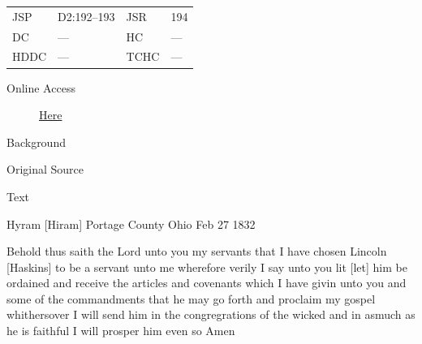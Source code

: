 				\begin{tabular}{p{0.5in}p{1in}p{0.5in}p{1in}}
				JSP	 	& D2:192--193	& JSR 		& 194 \\
				DC	 	& ---	 	& HC 		& --- \\
				HDDC 	& ---		& TCHC 		& --- \\
				\end{tabular}
			
			\begin{description}
				\item[Online Access] \href{https://www.josephsmithpapers.org/paper-summary/revelation-27-february-1832/1}{Here}
			\end{description}
			
			\begin{description}
				\item[Background]
			\end{description}
			
			
			\begin{description}
				\item[Original Source]
			\end{description}
			
			
			\begin{description}
				\item[Text]
			\end{description}
			
				Hyram [Hiram] Portage County Ohio Feb 27 1832
				
				Behold thus saith the Lord unto you my servants that I have chosen Lincoln [Haskins] to be a servant unto me wherefore verily I say unto you lit [let] him be ordained and receive the articles and covenants which I have givin unto you and some of the commandments that he may go forth and proclaim my gospel whithersover I will send him in the congregrations of the wicked and in asmuch as he is faithful I will prosper him even so Amen
				
